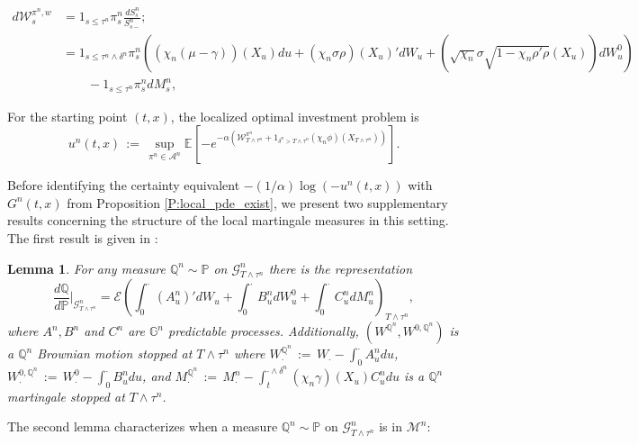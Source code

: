 \documentclass[11pt, letterpaper]{amsart}
\newtheorem{lemma}[theorem]{Lemma}
\theoremstyle{definition}
\theoremstyle{remark}
\numberwithin{equation}{section}
\newcommand{\We}{\mathcal{W}}
\newcommand{\prob}{\mathbb{P}}
\newcommand{\qprob}{\mathbb{Q}}
\newcommand{\esp}{\mathbb{E}}
\newcommand{\espalt}[2]{\esp^{#1}\bra{#2}}
\newcommand{\G}{\mathcal{G}}
\newcommand{\M}{\mathcal{M}}
\newcommand{\filtg}{\mathbb{G}}
\newcommand{\EN}{\mathcal{E}}
\newcommand{\dfn}{\, := \,}
\newcommand{\bra}[1]{\left[#1\right]}
\begin{document}
\begin{equation}\label{E:wealth_dynamics_n}
\begin{split}
d\We^{\pi^n,w}_s &= 1_{s\leq \tau^n} \pi^n_s\frac{dS^n_s}{S^n_{s-}};\\
&= 1_{s\leq\tau^n\wedge\delta^n}\pi^n_s\left(\left(\chi_n(\mu-\gamma)\right)(X_u) du + \left(\chi_n\sigma\rho\right)(X_u)'dW_u + \left(\sqrt{\chi_n}\sigma\sqrt{1-\chi_n\rho'\rho}(X_u)\right)dW^0_u\right)\\
&\qquad - 1_{s\leq \tau^n}\pi^n_s dM^n_s,
\end{split}
\end{equation}

For the starting point $(t,x)$, the localized optimal investment problem is
\begin{equation}\label{E:util_funct_n}
u^n(t,x) \dfn \sup_{\pi^n\in\mathcal{A}^n} \espalt{}{-e^{-\alpha\left(\We^{\pi^n}_{T\wedge\tau^n} + 1_{\delta^n > T\wedge\tau^n} \left(\chi_n\phi\right)(X_{T\wedge\tau^n})\right)}}.
\end{equation}


Before identifying the certainty equivalent $-(1/\alpha)\log(-u^n(t,x))$ with $G^n(t,x)$ from Proposition \ref{P:local_pde_exist}, we present two supplementary results concerning the structure of the local martingale measures in this setting. The first result is given in \cite[Proposition 5.3.1]{bielecki2004credit}:

\begin{lemma}\label{L:BR_Girsanov}
For any measure $\qprob^n\sim \prob$ on $\G^n_{T\wedge\tau^n}$ there is the representation
\begin{equation*}
\frac{d\qprob}{d\prob}\bigg|_{\G^n_{T\wedge\tau^n}} = \EN\left(\int_0^\cdot (A^n_u)'dW_u + \int_0^\cdot B^n_u dW^0_u + \int_0^\cdot C^n_u dM^n_u\right)_{T\wedge\tau^n},
\end{equation*}
where $A^n,B^n$ and $C^n$ are $\filtg^n$ predictable processes.  Additionally, $(W^{\qprob^n},W^{0,\qprob^n})$ is a $\qprob^n$ Brownian motion stopped at $T\wedge\tau^n$ where $W^{\qprob^n}_\cdot \dfn W_{\cdot} - \int_0^{\cdot} A^n_u du$, $W^{0,\qprob^n}_\cdot \dfn W^0_{\cdot} - \int_0^{\cdot} B^n_u du$, and $M^{\qprob^n}_\cdot\dfn M^n_{\cdot} - \int_t^{\cdot\wedge\delta^n} \left(\chi_n\gamma\right)(X_u)C^n_udu$  is a $\qprob^n$ martingale stopped at $T\wedge\tau^n$.
\end{lemma}

The second lemma characterizes when a measure $\qprob^n\sim\prob$ on $\G^n_{T\wedge\tau^n}$ is in $\M^n$:
\end{document}
